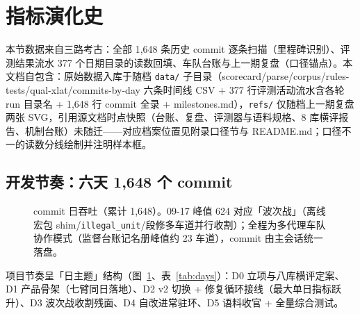 \section{指标演化史}

本节数据来自三路考古：全部 1{,}648 条历史 commit 逐条扫描（里程碑识别）、评测结果流水 377 个日期目录的读数回填、车队台账与上一期复盘（口径锚点）。本文档自包含：原始数据入库于随档 \texttt{data/} 子目录（scorecard/parse/corpus/rules-tests/qual-xlat/commits-by-day 六条时间线 CSV + 377 行评测活动流水含各轮 run 目录名 + 1{,}648 行 commit 全录 + milestones.md），\texttt{refs/} 仅随档上一期复盘两张 SVG，引用源文档时点快照（台账、复盘、评测器与语料规格、8 库横评报告、机制台账）未随迁——对应档案位置见附录口径节与 README.md；口径不一的读数分线绘制并注明样本框。

\subsection{开发节奏：六天 1{,}648 个 commit}

\begin{figure}[htbp]
\centering
{}
\caption{commit 日吞吐（累计 1{,}648）。09-17 峰值 624 对应「波次战」（离线宏包 shim/\texttt{illegal\_unit}/段修多车道并行收割）；全程为多代理车队协作模式（监督台账记名册峰值约 23 车道），commit 由主会话统一落盘。}
\label{fig:commits}
\end{figure}

项目节奏呈「日主题」结构（图~\ref{fig:commits}、表~\ref{tab:days}）：D0 立项与八库横评定案、D1 产品骨架（七臂同日落地）、D2 v2 切换 + 修复循环接线（最大单日指标跃升）、D3 波次战收割残面、D4 自改进常驻环、D5 语料收官 + 全量综合测试。

